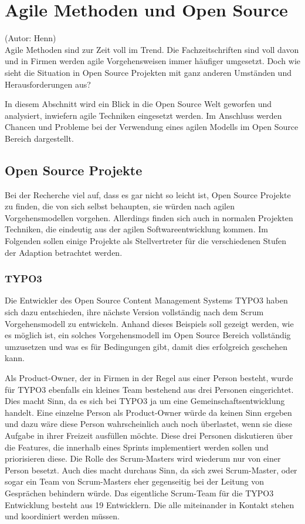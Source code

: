 \section{Agile Methoden und Open Source}
(Autor: Henn)\\
Agile Methoden sind zur Zeit voll im Trend. Die Fachzeitschriften sind voll davon und in Firmen
werden agile Vorgehensweisen immer häufiger umgesetzt. Doch wie sieht die Situation in Open Source
Projekten mit ganz anderen Umständen und Herausforderungen aus?

In diesem Abschnitt wird ein Blick in die Open Source Welt geworfen und
analysiert, inwiefern agile Techniken eingesetzt werden. Im Anschluss werden
Chancen und Probleme bei der Verwendung eines agilen Modells im Open Source
Bereich dargestellt.


\subsection{Open Source Projekte}
Bei der Recherche viel auf, dass es gar nicht so leicht ist, Open Source
Projekte zu finden, die von sich selbst behaupten, sie würden nach agilen
Vorgehensmodellen vorgehen. Allerdings finden sich auch in normalen Projekten
Techniken, die eindeutig aus der agilen Softwareentwicklung kommen. Im Folgenden
sollen einige Projekte als Stellvertreter für die verschiedenen Stufen der
Adaption betrachtet werden.

\subsubsection{TYPO3}
Die Entwickler des Open Source Content Management Systems TYPO3 haben sich dazu
entschieden, ihre nächste Version vollständig nach dem Scrum Vorgehensmodell zu
entwickeln. Anhand dieses Beispiels soll gezeigt werden, wie es möglich ist,
ein solches Vorgehensmodell im Open Source Bereich vollständig umzusetzen und
was es für Bedingungen gibt, damit dies erfolgreich geschehen kann.


Als Product-Owner, der in Firmen in der Regel aus einer Person besteht, wurde für TYPO3
ebenfalls ein kleines Team bestehend aus drei Personen eingerichtet. Dies macht Sinn, da es sich bei
TYPO3 ja um eine Gemeinschaftsentwicklung handelt. Eine einzelne Person als Product-Owner würde da
keinen Sinn ergeben und dazu wäre diese Person wahrscheinlich auch noch überlastet, wenn sie diese
Aufgabe in ihrer Freizeit ausfüllen möchte. Diese drei Personen diskutieren über die Features, die
innerhalb eines Sprints implementiert werden sollen und priorisieren diese.
\newline Die Rolle des Scrum-Masters wird wiederum nur von einer Person besetzt. Auch dies macht
durchaus Sinn, da sich zwei Scrum-Master, oder sogar ein Team von Scrum-Masters eher gegenseitig bei
der Leitung von Gesprächen behindern würde.
\newline Das eigentliche Scrum-Team für die TYPO3 Entwicklung besteht aus 19 Entwicklern. Die alle
miteinander in Kontakt stehen und koordiniert werden müssen.

